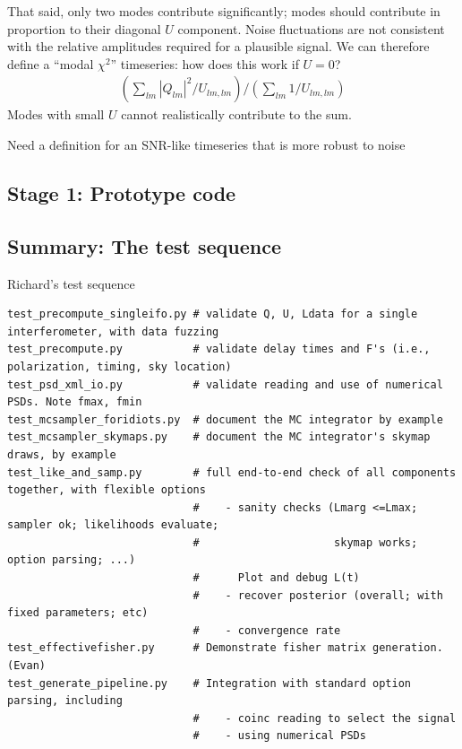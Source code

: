 \documentclass[twocolumn,prd,nofootinbib]{revtex4}
\newcommand\editremark[1]{{\color{red} #1}}
\begin{document}
\begin{widetext}
\begin{shaded}
That said, only two modes contribute significantly; modes should contribute in proportion to their diagonal $U$
component.  Noise fluctuations are not consistent with the relative amplitudes required for a plausible signal.  We can
therefore define a ``modal $\chi^2$'' timeseries: \editremark{how does this work if $U=0$?}
\begin{eqnarray}
(\sum_{lm} |Q_{lm}|^2/U_{lm,lm})/(\sum_{lm} 1/U_{lm,lm})
\end{eqnarray}
Modes with small $U$ cannot realistically contribute to the sum.

\editremark{Need a definition for an SNR-like timeseries that is more robust to noise}
\end{shaded}


\begin{widetext}
\section{Stage 1: Prototype code}
\subsection{Summary: The test sequence}

Richard's test sequence
\begin{verbatim}
test_precompute_singleifo.py # validate Q, U, Ldata for a single interferometer, with data fuzzing
test_precompute.py           # validate delay times and F's (i.e., polarization, timing, sky location)
test_psd_xml_io.py           # validate reading and use of numerical PSDs. Note fmax, fmin
test_mcsampler_foridiots.py  # document the MC integrator by example
test_mcsampler_skymaps.py    # document the MC integrator's skymap draws, by example
test_like_and_samp.py        # full end-to-end check of all components together, with flexible options
                             #    - sanity checks (Lmarg <=Lmax; sampler ok; likelihoods evaluate;
                             #                     skymap works; option parsing; ...)
                             #      Plot and debug L(t)
                             #    - recover posterior (overall; with fixed parameters; etc)
                             #    - convergence rate
test_effectivefisher.py      # Demonstrate fisher matrix generation. (Evan)
test_generate_pipeline.py    # Integration with standard option parsing, including
                             #    - coinc reading to select the signal
                             #    - using numerical PSDs
\end{verbatim}




\end{widetext}
\end{widetext}
\end{document}
